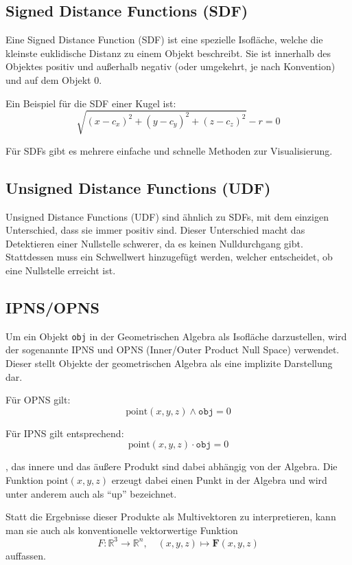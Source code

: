 \documentclass[
	ngerman,%
	accentcolor=9c,%
	ruledheaders=section,%
	class=report,%
	thesis={type=bachelor},%
	fontsize=11pt,%
	parskip=half-,%
	custommargins=true,%
	marginpar=false,%
]{tudapub}
\begin{document}
\subsection{Signed Distance Functions (SDF)}
Eine Signed Distance Function (SDF) ist eine spezielle Isofläche, welche die kleinste
euklidische Distanz zu einem Objekt beschreibt. Sie ist innerhalb des Objektes positiv und
außerhalb negativ (oder umgekehrt, je nach Konvention) und auf dem Objekt $0$.

Ein Beispiel für die SDF einer Kugel ist:
\[
\sqrt{(x - c_x)^2 + (y - c_y)^2 + (z - c_z)^2} - r = 0
\]

Für SDFs gibt es mehrere einfache und schnelle Methoden zur Visualisierung.




\subsection{Unsigned Distance Functions (UDF)}
Unsigned Distance Functions (UDF) sind ähnlich zu SDFs, mit dem einzigen Unterschied,
dass sie immer positiv sind. Dieser Unterschied macht das Detektieren einer Nullstelle
schwerer, da es keinen Nulldurchgang gibt. Stattdessen muss ein Schwellwert hinzugefügt
werden, welcher entscheidet, ob eine Nullstelle erreicht ist.

\subsection{IPNS/OPNS}
Um ein Objekt \texttt{obj} in der Geometrischen Algebra als Isofläche darzustellen, wird der sogenannte IPNS und OPNS (Inner/Outer Product Null Space) verwendet. Dieser stellt Objekte der geometrischen Algebra als eine implizite Darstellung dar.

Für OPNS gilt:
\[
\text{point}(x,y,z) \wedge \texttt{obj} = 0
\]

Für IPNS gilt entsprechend:
\[
\text{point}(x,y,z) \cdot \texttt{obj} = 0 
\]

, das innere und das äußere Produkt sind dabei abhängig von der Algebra. Die Funktion \(\text{point}(x, y, z)\) erzeugt dabei einen Punkt in der Algebra und wird unter anderem auch als \enquote{up} bezeichnet.

Statt die Ergebnisse dieser Produkte als Multivektoren zu interpretieren, 
kann man sie auch als konventionelle vektorwertige Funktion
\[
F : \mathbb{R}^3 \to \mathbb{R}^n, 
\quad (x,y,z) \mapsto \mathbf{F}(x,y,z)
\]
auffassen.
\end{document}
